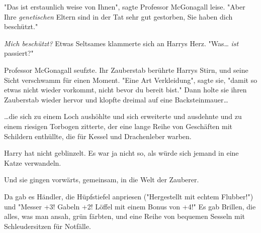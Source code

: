 "Das ist erstaunlich weise von Ihnen", sagte Professor McGonagall leise. "Aber Ihre \emph{genetischen} Eltern sind in der Tat sehr gut gestorben, Sie haben dich beschützt."

\emph{Mich beschützt?} Etwas Seltsames klammerte sich an Harrys Herz. "Was… \emph{ist} passiert?" 

Professor McGonagall seufzte. Ihr Zauberstab berührte Harrys Stirn, und seine Sicht verschwamm für einen Moment. "Eine Art Verkleidung", sagte sie, "damit so etwas nicht wieder vorkommt, nicht bevor du bereit bist." Dann holte sie ihren Zauberstab wieder hervor und klopfte dreimal auf eine Backsteinmauer…

…die sich zu einem Loch aushöhlte und sich erweiterte und ausdehnte und zu einem riesigen Torbogen zitterte, der eine lange Reihe von Geschäften mit Schildern enthüllte, die für Kessel und Drachenleber warben.

Harry hat nicht geblinzelt. Es war ja nicht so, als würde sich jemand in eine Katze verwandeln.

Und sie gingen vorwärts, gemeinsam, in die Welt der Zauberer. 

Da gab es Händler, die Hüpfstiefel anpriesen ("Hergestellt mit echtem Flubber!") und "Messer +3! Gabeln +2! Löffel mit einem Bonus von +4!" Es gab Brillen, die alles, was man ansah, grün färbten, und eine Reihe von bequemen Sesseln mit Schleudersitzen für Notfälle. 

